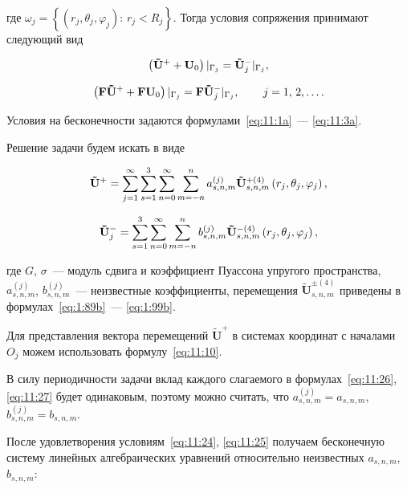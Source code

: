 \noindent где $\omega_j = \left\{ {\left( {{r_j},{\theta _j},{\varphi _j}} \right):\, {r_j} < {R_j}} \right\}$. Тогда условия сопряжения принимают следующий вид

\begin{equation}
\left( {{{{\bf{\tilde U}}}^ + } + {{\bf{U}}_0}} \right){|_{{\Gamma _j}}} = {\bf{\tilde U}}_j^ - {|_{{\Gamma _j}}},
\label{eq:11:24}
\end{equation}

\begin{equation}
\left( {{\bf{F\tilde U^+}} + {\bf{F}}{{\bf{U}}_0}} \right){|_{{\Gamma _j}}} = {\bf{F}}{{\bf{\tilde U^-}}_j}{|_{{\Gamma _j}}},\qquad {\kern 1pt} j = 1,{\mkern 1mu} {\kern 1pt} 2,\dots.
\label{eq:11:25}
\end{equation}

\noindent Условия на бесконечности задаются формулами~\eqref{eq:11:1a}~--- \eqref{eq:11:3a}.

Решение задачи будем искать в виде

\begin{equation}
{\bf{\tilde U^+}} = \sum\limits_{j = 1}^\infty {\sum\limits_{s = 1}^3 {\sum\limits_{n = 0}^\infty  {\sum\limits_{m=-n}^{n} {a_{s,n,m}^{(j)}} } } } {\bf{\tilde U}}_{s,n,m}^{ + (4)}\left( {{r_j},{\theta _j},{\varphi _j}} \right),
\label{eq:11:26}
\end{equation}

\begin{equation}
\mathbf{\tilde U}_j^- = {\sum\limits_{s = 1}^3 {\sum\limits_{n = 0}^\infty  {\sum\limits_{m=-n}^{n} {b_{s,n,m}^{(j)}} } } } {\bf{\tilde U}}_{s,n,m}^{ - (4)}\left( {{r_j},{\theta _j},{\varphi _j}} \right),
\label{eq:11:27}
\end{equation}

\noindent где $G$, $\sigma$~--- модуль сдвига и коэффициент Пуассона упругого пространства, $a_{s,n,m}^{(j)}$, $b_{s,n,m}^{(j)}$~--- неизвестные коэффициенты, перемещения $\mathbf{\tilde U}_{s,n,m}^{\pm(4)}$ приведены в формулах~\eqref{eq:1:89b}~--- \eqref{eq:1:99b}.

Для представления вектора перемещений $\mathbf{\tilde U}^+$ в системах координат с началами $O_j$ можем использовать формулу~\eqref{eq:11:10}.

В силу периодичности задачи вклад каждого слагаемого в формулах~\eqref{eq:11:26}, \eqref{eq:11:27} будет одинаковым, поэтому можно считать, что $a_{s,n,m}^{(j)}=a_{s,n,m}$, $b_{s,n,m}^{(j)}=b_{s,n,m}$.

После удовлетворения условиям~\eqref{eq:11:24}, \eqref{eq:11:25} получаем бесконечную систему линейных алгебраических уравнений относительно неизвестных $a_{s,n,m}$, $b_{s,n,m}$:

